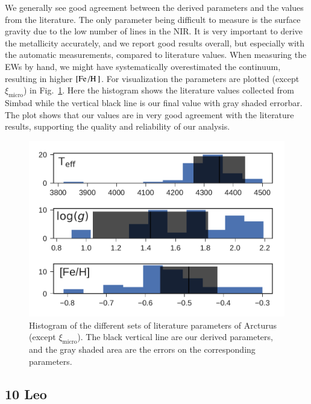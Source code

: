 \documentclass{aa}
\begin{document}
We generally see good agreement between the derived parameters and the values
from the literature. The only parameter being difficult to measure is the
surface gravity due to the low number of  lines in the NIR. It is
very important to derive the metallicity accurately, and we report good results
overall, but especially with the automatic measurements, compared to literature
values. When measuring the EWs by hand, we might have systematically
overestimated the continuum, resulting in higher $[\ion{Fe}/\ion{H}]$. For
visualization the parameters are plotted (except $\xi_\mathrm{micro}$) in
Fig.~\ref{fig:arcturus}. Here the histogram shows the literature values
collected from Simbad while the vertical black line is our final value with gray
shaded errorbar. The plot shows that our values are in very good agreement with
the literature results, supporting the quality and reliability of our analysis.

\begin{figure}[htpb!]
    \centering
    \includegraphics[width=1.0\linewidth]{figures/ArcturusParams.pdf}
    \caption{Histogram of the different sets of literature parameters of
             Arcturus (except $\xi_\mathrm{micro}$). The black vertical line are
             our derived parameters, and the gray shaded area are the errors on
             the corresponding parameters.}
    \label{fig:arcturus}
\end{figure}



\subsection{10 Leo}
\label{sec:10Leo}
\end{document}
